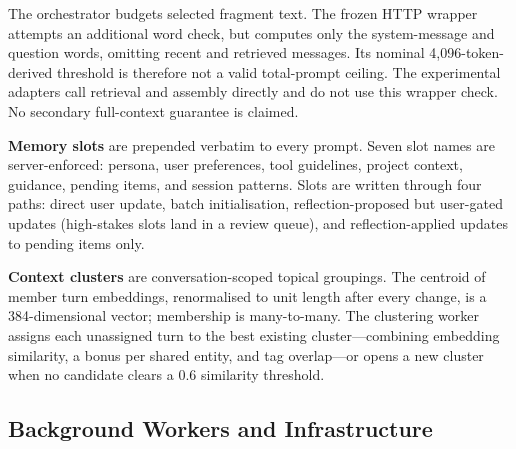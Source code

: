 \documentclass[11pt,a4paper]{article}
\begin{document}
The orchestrator budgets selected fragment text. The frozen HTTP wrapper attempts an additional word check, but computes only the system-message and question words, omitting recent and retrieved messages. Its nominal 4,096-token-derived threshold is therefore not a valid total-prompt ceiling. The experimental adapters call retrieval and assembly directly and do not use this wrapper check. No secondary full-context guarantee is claimed.

\textbf{Memory slots} are prepended verbatim to every prompt. Seven slot names are server-enforced: persona, user preferences, tool guidelines, project context, guidance, pending items, and session patterns. Slots are written through four paths: direct user update, batch initialisation, reflection-proposed but user-gated updates (high-stakes slots land in a review queue), and reflection-applied updates to pending items only.

\textbf{Context clusters} are conversation-scoped topical groupings. The centroid of member turn embeddings, renormalised to unit length after every change, is a 384-dimensional vector; membership is many-to-many. The clustering worker assigns each unassigned turn to the best existing cluster---combining embedding similarity, a bonus per shared entity, and tag overlap---or opens a new cluster when no candidate clears a 0.6 similarity threshold.

\subsection{Background Workers and Infrastructure}
\label{app:workers}
\end{document}
